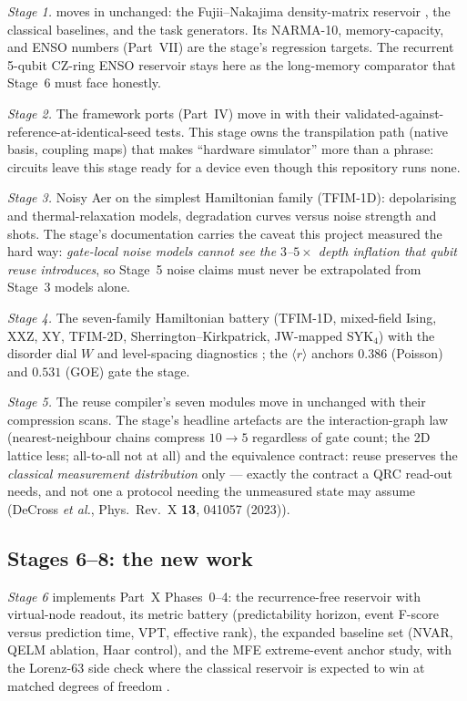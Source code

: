 \emph{Stage 1.}  moves in unchanged: the Fujii--Nakajima
density-matrix reservoir \citep{fujii2017harnessing}, the classical baselines,
and the task generators. Its NARMA-10, memory-capacity, and ENSO numbers
(Part~VII) are the stage's regression targets. The recurrent 5-qubit CZ-ring
ENSO reservoir stays here as the long-memory comparator that Stage~6 must
face honestly.

\emph{Stage 2.} The framework ports (Part~IV) move in with their
validated-against-reference-at-identical-seed tests. This stage owns the
transpilation path (native basis, coupling maps) that makes ``hardware
simulator'' more than a phrase: circuits leave this stage ready for a device
even though this repository runs none.

\emph{Stage 3.} Noisy Aer on the simplest Hamiltonian family (TFIM-1D):
depolarising and thermal-relaxation models, degradation curves versus noise
strength and shots. The stage's documentation carries the caveat this project
measured the hard way: \emph{gate-local noise models cannot see the
$3$--$5\times$ depth inflation that qubit reuse introduces}, so Stage~5
noise claims must never be extrapolated from Stage~3 models alone.

\emph{Stage 4.} The seven-family Hamiltonian battery (TFIM-1D, mixed-field
Ising, XXZ, XY, TFIM-2D, Sherrington--Kirkpatrick, JW-mapped SYK$_4$) with
the disorder dial $W$ and level-spacing diagnostics
\citep{martinez2021dynamical,kobayashi2026edge}; the $\langle r\rangle$
anchors $0.386$ (Poisson) and $0.531$ (GOE) gate the stage.

\emph{Stage 5.} The reuse compiler's seven modules move in unchanged with
their compression scans. The stage's headline artefacts are the
interaction-graph law (nearest-neighbour chains compress $10\to5$ regardless
of gate count; the 2D lattice less; all-to-all not at all) and the
equivalence contract: reuse preserves the \emph{classical measurement
distribution} only --- exactly the contract a QRC read-out needs, and not one
a protocol needing the unmeasured state may assume (DeCross \emph{et al.},
Phys.\ Rev.\ X \textbf{13}, 041057 (2023)).

\subsection{Stages 6--8: the new work}
\label{sec:repo-new}

\emph{Stage 6} implements Part~X Phases~0--4: the recurrence-free reservoir
with virtual-node readout, its metric battery (predictability horizon,
event F-score versus prediction time, VPT, effective rank), the expanded
baseline set (NVAR, QELM ablation, Haar control), and the MFE extreme-event
anchor study, with the Lorenz-63 side check where the classical reservoir is
expected to win at matched degrees of freedom
\citep{ahmed2024prediction,ahmed2025optimal}.


